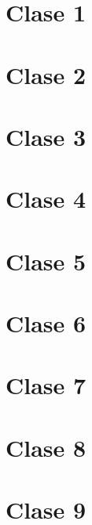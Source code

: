 \documentclass[12pt, letter]{article}
\begin{document}

\thispagestyle{fancy}
\noindent\makebox[\linewidth]{\rule{\paperwidth}{0.4pt}}
\section{Clase 1}


\noindent\makebox[\linewidth]{\rule{\paperwidth}{0.4pt}}

\section{Clase 2}



\noindent\makebox[\linewidth]{\rule{\paperwidth}{0.4pt}}

\section{Clase 3}


\noindent\makebox[\linewidth]{\rule{\paperwidth}{0.4pt}}
\section{Clase 4}


\noindent\makebox[\linewidth]{\rule{\paperwidth}{0.4pt}}
\section{Clase 5}


\noindent\makebox[\linewidth]{\rule{\paperwidth}{0.4pt}}

\section{Clase 6}



\noindent\makebox[\linewidth]{\rule{\paperwidth}{0.4pt}}
\section{Clase 7}



\noindent\makebox[\linewidth]{\rule{\paperwidth}{0.4pt}}
\section{Clase 8}


\noindent\makebox[\linewidth]{\rule{\paperwidth}{0.4pt}}
\section{Clase 9}

\end{document}
